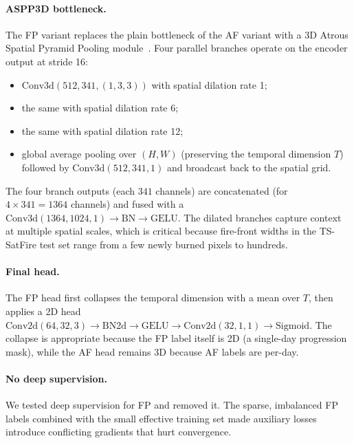 \documentclass[sensors,article,submit,moreauthors,pdftex]{Definitions/mdpi}
\begin{document}
\paragraph*{ASPP3D bottleneck.} The FP variant replaces the plain bottleneck of the AF variant with a 3D Atrous Spatial Pyramid Pooling module~\cite{chen2017rethinking,chen2018encoder}. Four parallel branches operate on the encoder output at stride 16:
\begin{itemize}
  \item $\mathrm{Conv3d}(512, 341, (1, 3, 3))$ with spatial dilation rate 1;
  \item the same with spatial dilation rate 6;
  \item the same with spatial dilation rate 12;
  \item global average pooling over $(H, W)$ (preserving the temporal dimension $T$) followed by $\mathrm{Conv3d}(512, 341, 1)$ and broadcast back to the spatial grid.
\end{itemize}
The four branch outputs (each $341$ channels) are concatenated (for $4 \times 341 = 1364$ channels) and fused with a $\mathrm{Conv3d}(1364, 1024, 1) \to \mathrm{BN} \to \mathrm{GELU}$. The dilated branches capture context at multiple spatial scales, which is critical because fire-front widths in the TS-SatFire test set range from a few newly burned pixels to hundreds.

\paragraph*{Final head.} The FP head first collapses the temporal dimension with a mean over $T$, then applies a 2D head $\mathrm{Conv2d}(64, 32, 3) \to \mathrm{BN2d} \to \mathrm{GELU} \to \mathrm{Conv2d}(32, 1, 1) \to \mathrm{Sigmoid}$. The collapse is appropriate because the FP label itself is 2D (a single-day progression mask), while the AF head remains 3D because AF labels are per-day.

\paragraph*{No deep supervision.} We tested deep supervision for FP and removed it. The sparse, imbalanced FP labels combined with the small effective training set made auxiliary losses introduce conflicting gradients that hurt convergence.
\end{document}
